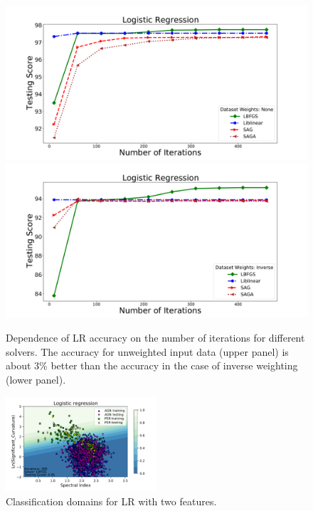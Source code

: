 \begin{figure}[h]
\includegraphics[width=\twopicsp\textwidth]{plots/lr_train.pdf}
\includegraphics[width=\twopicsp\textwidth]{plots/lr_train_weights.pdf}
\caption{Dependence of LR accuracy on the number of iterations for different solvers. The accuracy for unweighted input data (upper panel) is about 3\% better than the accuracy in the case of inverse weighting (lower panel).}
\label{fig:LR_accuracy}
\end{figure}



\begin{figure}[h]
\includegraphics[width=0.5\textwidth]{plots/classification_domains/lr_200_lbfgs.pdf}
\caption{Classification domains for LR with two features.}
\label{fig:LR_domains}
\end{figure}


